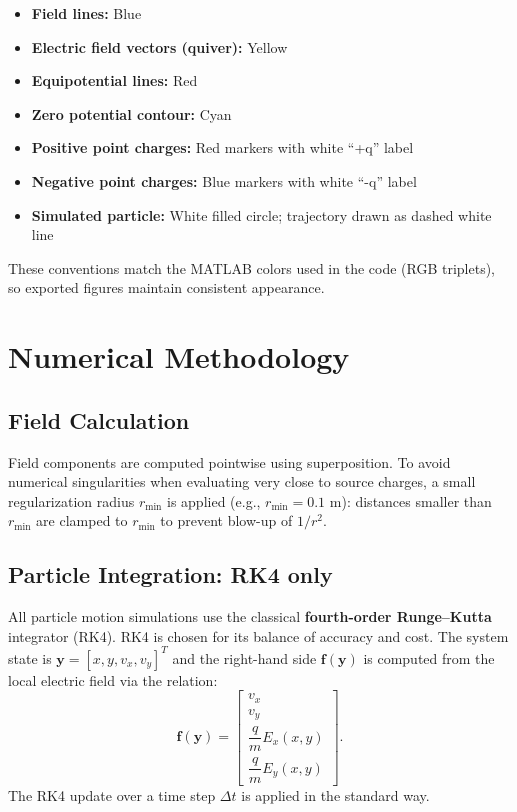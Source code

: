 \documentclass[12pt,a4paper]{article}
\begin{document}
\begin{itemize}
    \item \textbf{Field lines:} \textcolor{myblue}{Blue}
    \item \textbf{Electric field vectors (quiver):} \textcolor{myyellow}{Yellow}
    \item \textbf{Equipotential lines:} \textcolor{myred}{Red}
    \item \textbf{Zero potential contour:} \textcolor{mycyan}{Cyan}
    \item \textbf{Positive point charges:} Red markers with white ``+q'' label
    \item \textbf{Negative point charges:} Blue markers with white ``-q'' label
    \item \textbf{Simulated particle:} White filled circle; trajectory drawn as dashed white line
\end{itemize}

These conventions match the MATLAB colors used in the code (RGB triplets), so exported figures maintain consistent appearance.

\section{Numerical Methodology}

\subsection{Field Calculation}
Field components are computed pointwise using superposition. To avoid numerical singularities when evaluating very close to source charges, a small regularization radius $r_\text{min}$ is applied (e.g., $r_\text{min}=0.1$ m): distances smaller than $r_\text{min}$ are clamped to $r_\text{min}$ to prevent blow-up of $1/r^2$.

\subsection{Particle Integration: RK4 only}
All particle motion simulations use the classical \textbf{fourth-order Runge–Kutta} integrator (RK4). RK4 is chosen for its balance of accuracy and cost. The system state is $\mathbf{y} = [x, y, v_x, v_y]^T$ and the right-hand side $\mathbf{f}(\mathbf{y})$ is computed from the local electric field via the relation:
\[
    \mathbf{f}(\mathbf{y}) = 
    \begin{bmatrix} 
        v_x \\ v_y \\ \dfrac{q}{m}E_x(x,y) \\ \dfrac{q}{m}E_y(x,y)
    \end{bmatrix}.
\]
The RK4 update over a time step $\Delta t$ is applied in the standard way.
\end{document}
